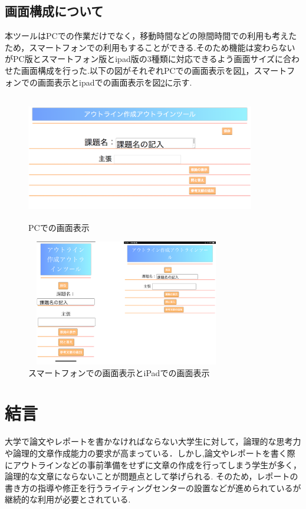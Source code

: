 \documentclass[a4j,12pt]{jarticle}
\begin{document}
\newpage
\subsection{画面構成について}
本ツールはPCでの作業だけでなく，移動時間などの隙間時間での利用も考えたため，スマートフォンでの利用もすることができる.そのため機能は変わらないがPC版とスマートフォン版とipad版の3種類に対応できるよう画面サイズに合わせた画面構成を行った.以下の図がそれぞれPCでの画面表示を図\ref{fig:p}，スマートフォンでの画面表示とipadでの画面表示を図\ref{fig:q}に示す.
\begin{figure}[h]
\begin{center}
 \includegraphics[clip,width=100mm,height=55mm]{figure/08gamen.png}
\end{center}
 \caption{PCでの画面表示}
 \label{fig:p}
\end{figure}

\begin{figure}[h]
\begin{center}
 \includegraphics[clip,width=88mm,height=55mm]{figure/17.png}
\end{center}
 \caption{スマートフォンでの画面表示とiPadでの画面表示}
 \label{fig:q}
\end{figure}
\newpage

\section{結言}
大学で論文やレポートを書かなければならない大学生に対して，論理的な思考力や論理的文章作成能力の要求が高まっている．しかし,論文やレポートを書く際にアウトラインなどの事前準備をせずに文章の作成を行ってしまう学生が多く，論理的な文章にならないことが問題点として挙げられる.
そのため，レポートの書き方の指導や修正を行うライティングセンターの設置などが進められているが継続的な利用が必要とされている.
\end{document}
